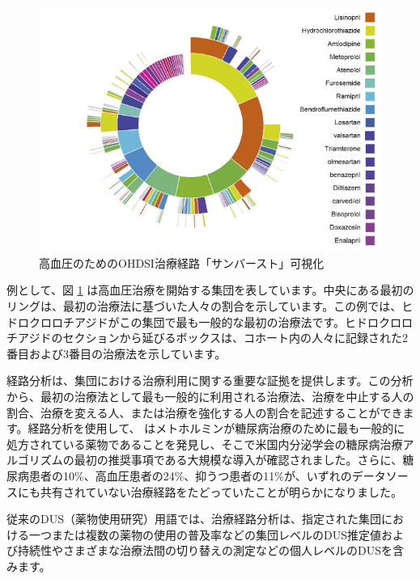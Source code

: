 \documentclass[
  11pt]{book}
\theoremstyle{definition}
\theoremstyle{definition}
\theoremstyle{definition}
\theoremstyle{definition}
\theoremstyle{remark}
\begin{document}
\begin{figure}

{\centering \includegraphics[width=1\linewidth]{images/Characterization/pnasTreatmentPathwaysSunburst} 

}

\caption{高血圧のためのOHDSI治療経路「サンバースト」可視化}\label{fig:treatmentPathwaysSunburstDataViz}
\end{figure}

例として、図 \ref{fig:treatmentPathwaysSunburstDataViz} は高血圧治療を開始する集団を表しています。中央にある最初のリングは、最初の治療法に基づいた人々の割合を示しています。この例では、ヒドロクロロチアジドがこの集団で最も一般的な最初の治療法です。ヒドロクロロチアジドのセクションから延びるボックスは、コホート内の人々に記録された2番目および3番目の治療法を示しています。

経路分析は、集団における治療利用に関する重要な証拠を提供します。この分析から、最初の治療法として最も一般的に利用される治療法、治療を中止する人の割合、治療を変える人、または治療を強化する人の割合を記述することができます。経路分析を使用して、\citet{Hripcsak7329} はメトホルミンが糖尿病治療のために最も一般的に処方されている薬物であることを発見し、そこで米国内分泌学会の糖尿病治療アルゴリズムの最初の推奨事項である大規模な導入が確認されました。さらに、糖尿病患者の10\%、高血圧患者の24\%、抑うつ患者の11\%が、いずれのデータソースにも共有されていない治療経路をたどっていたことが明らかになりました。

従来のDUS（薬物使用研究）用語では、治療経路分析は、指定された集団における一つまたは複数の薬物の使用の普及率などの集団レベルのDUS推定値および持続性やさまざまな治療法間の切り替えの測定などの個人レベルのDUSを含みます。
\end{document}
